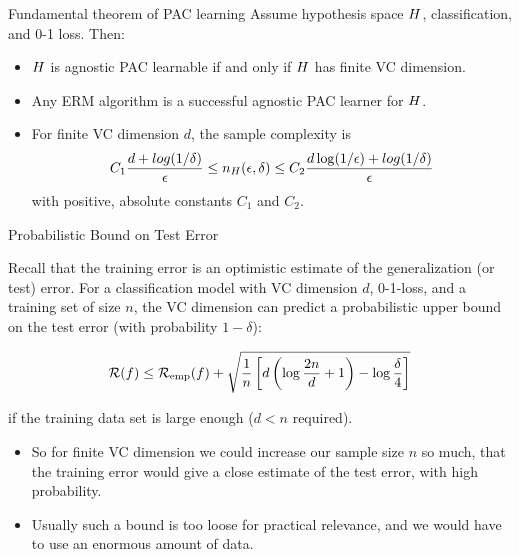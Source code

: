 \begin{vbframe}{Fundamental theorem of PAC learning}
  Assume hypothesis space $H$, classification, and 0-1 loss. Then:

\lz

\begin{itemize}
    \item $H$ is agnostic PAC learnable if and only if $H$ has finite VC dimension.
    \item Any ERM algorithm is a successful agnostic PAC learner for $H$.
    \item For finite VC dimension $d$, the sample complexity is
      $$ C_1 \frac{d + log(1/\delta)}{\epsilon} \leq
      n_H(\epsilon, \delta) \leq 
         C_2 \frac{d \log(1/\epsilon) + log(1/\delta)}{\epsilon} 
      $$
      with positive, absolute constants $C_1$ and $C_2$.
\end{itemize}
\end{vbframe}


\begin{vbframe}{Probabilistic Bound on Test Error}

\small{Recall that the training error is an optimistic estimate of the generalization (or test) error. For a classification model with VC dimension $d$, 0-1-loss, and a training set of size $n$, the VC dimension can predict a probabilistic upper bound on the test error (with probability $1-\delta$): 

$$
\mathcal{R}(f) \le \mathcal{R}_{\text{emp}}(f) + \sqrt{\frac{1}{n}\left[d\left(\log \frac{2n}{d}+ 1 \right)- \log \frac{\delta}{4}\right]}
$$

if the training data set is large enough ($d < n$ required).
}

\lz

\begin{itemize}
    \item So for finite VC dimension we could increase our sample size $n$ so much, that the training error
      would give a close estimate of the test error, with high probability.
    \item Usually such a bound is too loose for practical relevance, and we would have to use an enormous
      amount of data.
\end{itemize}
\end{vbframe}
  


